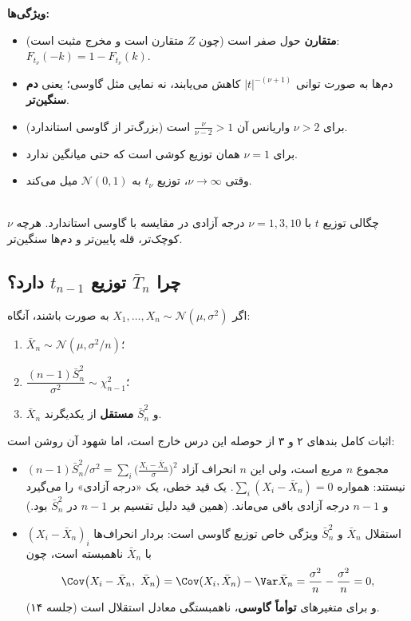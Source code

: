 \textbf{ویژگی‌ها:}
\begin{itemize}
\item \textbf{متقارن} حول صفر است (چون $Z$ متقارن است و مخرج مثبت است): $F_{t_\nu}(-k)=1-F_{t_\nu}(k)$.
\item دم‌ها به صورت توانی $|t|^{-(\nu+1)}$ کاهش می‌یابند، نه نمایی مثل گاوسی؛ یعنی \textbf{دم سنگین‌تر}.
\item برای $\nu>2$ واریانس آن $\frac{\nu}{\nu-2}>1$ است (بزرگ‌تر از گاوسی استاندارد).
\item برای $\nu=1$ همان توزیع کوشی است که حتی میانگین ندارد.
\item وقتی $\nu\to\infty$، توزیع $t_\nu$ به $\mathcal N(0,1)$ میل می‌کند.
\end{itemize}

\begin{center}
\begin{tikzpicture}
\end{tikzpicture}\\
{\small چگالی توزیع $t$ با $\nu=1,3,10$ درجه آزادی در مقایسه با گاوسی استاندارد. هرچه $\nu$ کوچک‌تر، قله پایین‌تر و دم‌ها سنگین‌تر.}
\end{center}

\subsection{چرا $\bar T_n$ توزیع $t_{n-1}$ دارد؟}
\begin{theorem}
اگر $X_1,\ldots,X_n\sim\mathcal N(\mu,\sigma^2)$ به صورت  باشند، آنگاه:
\begin{enumerate}
\item $\bar X_n\sim\mathcal N(\mu,\sigma^2/n)$؛
\item $\dfrac{(n-1)\bar S_n^2}{\sigma^2}\sim\chi^2_{n-1}$؛
\item $\bar X_n$ و $\bar S^2_n$ \textbf{مستقل} از یکدیگرند.
\end{enumerate}
\end{theorem}
اثبات کامل بندهای ۲ و ۳ از حوصله این درس خارج است، اما شهود آن روشن است:
\begin{itemize}
\item $(n-1)\bar S_n^2/\sigma^2=\sum_i\big(\frac{X_i-\bar X_n}{\sigma}\big)^2$ مجموع $n$ مربع است، ولی این $n$ انحراف آزاد نیستند: همواره $\sum_i(X_i-\bar X_n)=0$. یک قید خطی، یک «درجه آزادی» را می‌گیرد و $n-1$ درجه آزادی باقی می‌ماند. (همین قید دلیل تقسیم بر $n-1$ در $\bar S_n^2$ بود.)
\item استقلال $\bar X_n$ و $\bar S_n^2$ ویژگی خاص توزیع گاوسی است: بردار انحراف‌ها $(X_i-\bar X_n)_i$ با $\bar X_n$ ناهمبسته است، چون
\[
\Cov\big(X_i-\bar X_n,\ \bar X_n\big)=\Cov(X_i,\bar X_n)-\Var\bar X_n=\frac{\sigma^2}{n}-\frac{\sigma^2}{n}=0,
\]
و برای متغیرهای \textbf{توأماً گاوسی}، ناهمبستگی معادل استقلال است (جلسه ۱۴).
\end{itemize}

